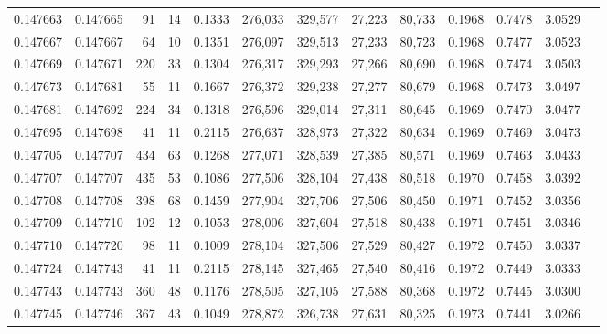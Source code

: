 \begin{tabular}{rrrrrrrrrrrrr}
0.147663 & 0.147665 &    91 &  14 &                                     0.1333 & 276,033 & 329,577 &  27,223 &  80,733 & 0.1968 & 0.7478 & 3.0529 \\
0.147667 & 0.147667 &    64 &  10 &                                     0.1351 & 276,097 & 329,513 &  27,233 &  80,723 & 0.1968 & 0.7477 & 3.0523 \\
0.147669 & 0.147671 &   220 &  33 &                                     0.1304 & 276,317 & 329,293 &  27,266 &  80,690 & 0.1968 & 0.7474 & 3.0503 \\
0.147673 & 0.147681 &    55 &  11 &                                     0.1667 & 276,372 & 329,238 &  27,277 &  80,679 & 0.1968 & 0.7473 & 3.0497 \\
0.147681 & 0.147692 &   224 &  34 &                                     0.1318 & 276,596 & 329,014 &  27,311 &  80,645 & 0.1969 & 0.7470 & 3.0477 \\
0.147695 & 0.147698 &    41 &  11 &                                     0.2115 & 276,637 & 328,973 &  27,322 &  80,634 & 0.1969 & 0.7469 & 3.0473 \\
0.147705 & 0.147707 &   434 &  63 &                                     0.1268 & 277,071 & 328,539 &  27,385 &  80,571 & 0.1969 & 0.7463 & 3.0433 \\
0.147707 & 0.147707 &   435 &  53 &                                     0.1086 & 277,506 & 328,104 &  27,438 &  80,518 & 0.1970 & 0.7458 & 3.0392 \\
0.147708 & 0.147708 &   398 &  68 &                                     0.1459 & 277,904 & 327,706 &  27,506 &  80,450 & 0.1971 & 0.7452 & 3.0356 \\
0.147709 & 0.147710 &   102 &  12 &                                     0.1053 & 278,006 & 327,604 &  27,518 &  80,438 & 0.1971 & 0.7451 & 3.0346 \\
0.147710 & 0.147720 &    98 &  11 &                                     0.1009 & 278,104 & 327,506 &  27,529 &  80,427 & 0.1972 & 0.7450 & 3.0337 \\
0.147724 & 0.147743 &    41 &  11 &                                     0.2115 & 278,145 & 327,465 &  27,540 &  80,416 & 0.1972 & 0.7449 & 3.0333 \\
0.147743 & 0.147743 &   360 &  48 &                                     0.1176 & 278,505 & 327,105 &  27,588 &  80,368 & 0.1972 & 0.7445 & 3.0300 \\
0.147745 & 0.147746 &   367 &  43 &                                     0.1049 & 278,872 & 326,738 &  27,631 &  80,325 & 0.1973 & 0.7441 & 3.0266 \\

\end{tabular}
